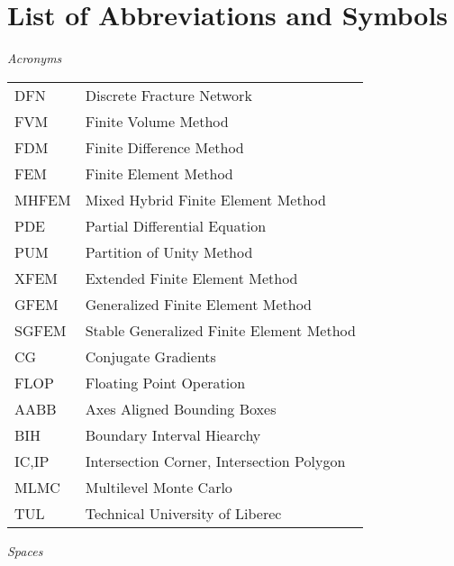 \chapter*{List of Abbreviations and Symbols}

\noindent\emph{Acronyms}
\vspace{0.5cm}

\begin{tabularx}{0.9\linewidth}{@{}lX@{}}
DFN & Discrete Fracture Network \\
FVM & Finite Volume Method \\
FDM & Finite Difference Method \\
FEM & Finite Element Method \\
MHFEM & Mixed Hybrid Finite Element Method \\
PDE & Partial Differential Equation \\
PUM & Partition of Unity Method \\
XFEM & Extended Finite Element Method \\
GFEM & Generalized Finite Element Method \\
SGFEM & Stable Generalized Finite Element Method \\
CG & Conjugate Gradients \\
FLOP & Floating Point Operation \\
AABB & Axes Aligned Bounding Boxes \\
BIH & Boundary Interval Hiearchy \\
IC,IP & Intersection Corner, Intersection Polygon\\
MLMC & Multilevel Monte Carlo\\
TUL & Technical University of Liberec\\
\end{tabularx}
\vspace{1cm}

\noindent\emph{Spaces}
\vspace{0.5cm}

